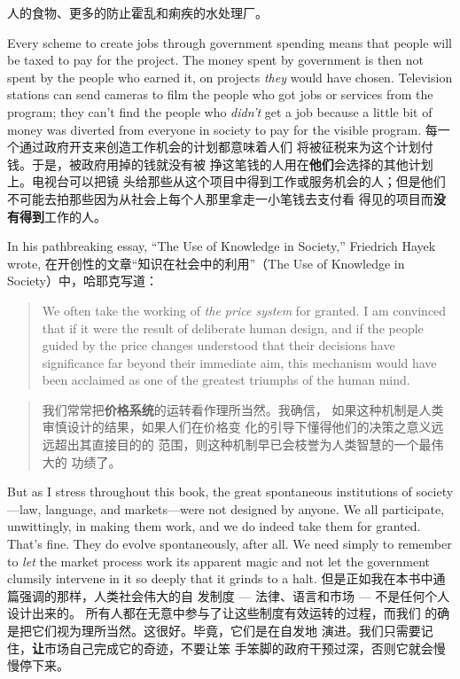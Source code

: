 \begin{paracol}{2}
\begin{itemize}
	人的食物、更多的防止霍乱和痢疾的水处理厂。
\end{itemize}
\switchcolumn*
Every scheme to create jobs through government spending
means that people will be taxed to pay for the project. The
money spent by government is then not spent by the people
who earned it, on projects \textit{they} would have chosen. Television
stations can send cameras to film the people who got jobs or
services from the program; they can't find the people who \textit{didn't} get a job because a little bit of money was diverted from
everyone in society to pay for the visible program.
\switchcolumn
每一个通过政府开支来创造工作机会的计划都意味着人们
将被征税来为这个计划付钱。于是，被政府用掉的钱就没有被
挣这笔钱的人用在\textbf{他们}会选择的其他计划上。电视台可以把镜
头给那些从这个项目中得到工作或服务机会的人；但是他们不可能去拍那些因为从社会上每个人那里拿走一小笔钱去支付看
得见的项目而\textbf{没有得到}工作的人。

In his pathbreaking essay, ``The Use of Knowledge in Society,''
Friedrich Hayek wrote,
\switchcolumn
在开创性的文章“知识在社会中的利用”（The  Use of Knowl­edge in Society）中，哈耶克写道：
\switchcolumn*
\begin{quote}
We often take the working of \textit{the price system} for granted. I
am convinced that if it were the result of deliberate human design, and if the people guided by the price changes understood
that their decisions have significance far beyond their immediate
aim, this mechanism would have been acclaimed as one of the
greatest triumphs of the human mind.
\end{quote}
\switchcolumn
\begin{quote}
我们常常把\textbf{价格系统}的运转看作理所当然。我确信，
如果这种机制是人类审慎设计的结果，如果人们在价格变
化的引导下懂得他们的决策之意义远远超出其直接目的的
范围，则这种机制早已会枝誉为人类智慧的一个最伟大的
功绩了。
\end{quote}
\switchcolumn*
But as I stress throughout this book, the great spontaneous
institutions of society---law, language, and markets---were not
designed by anyone. We all participate, unwittingly, in making
them work, and we do indeed take them for granted. That's
fine. They do evolve spontaneously, after all. We need simply to
remember to \textit{let} the market process work its apparent magic
and not let the government clumsily intervene in it so deeply
that it grinds to a halt.
\switchcolumn
但是正如我在本书中通篇强调的那样，人类社会伟大的自
发制度 --- 法律、语言和市场 --- 不是任何个人设计出来的。
所有人都在无意中参与了让这些制度有效运转的过程，而我们
的确是把它们视为理所当然。这很好。毕竟，它们是在自发地
演进。我们只需要记住，\textbf{让}市场自己完成它的奇迹，不要让笨
手笨脚的政府干预过深，否则它就会慢慢停下来。
\end{paracol}